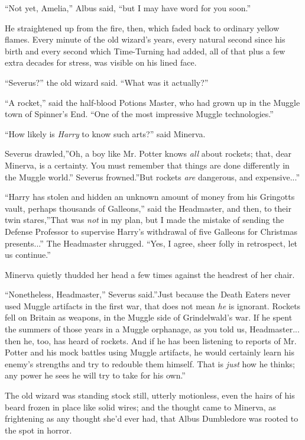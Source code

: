 ``Not yet, Amelia,'' Albus said, ``but I may have word for you soon.''

He straightened up from the fire, then, which faded back to ordinary
yellow flames. Every minute of the old wizard's years, every natural
second since his birth and every second which Time-Turning had added,
all of that plus a few extra decades for stress, was visible on his
lined face.

``Severus?'' the old wizard said. ``What was it actually?''

``A rocket,'' said the half-blood Potions Master, who had grown up in
the Muggle town of Spinner's End. ``One of the most impressive Muggle
technologies.''

``How likely is \emph{Harry} to know such arts?'' said Minerva.

Severus drawled,''Oh, a boy like Mr. Potter knows \emph{all} about
rockets; that, dear Minerva, is a certainty. You must remember that
things are done differently in the Muggle world.'' Severus frowned.''But
rockets \emph{are} dangerous, and expensive...''

``Harry has stolen and hidden an unknown amount of money from his
Gringotts vault, perhaps thousands of Galleons,'' said the Headmaster,
and then, to their twin stares,''That was \emph{not} in my plan, but I
made the mistake of sending the Defense Professor to supervise Harry's
withdrawal of five Galleons for Christmas presents...'' The
Headmaster shrugged. ``Yes, I agree, sheer folly in retrospect, let us
continue.''

Minerva quietly thudded her head a few times against the headrest of her
chair.

``Nonetheless, Headmaster,'' Severus said.''Just because the Death
Eaters never used Muggle artifacts in the first war, that does not mean
\emph{he} is ignorant. Rockets fell on Britain as weapons, in the Muggle
side of Grindelwald's war. If he spent the summers of those years in a
Muggle orphanage, as you told us, Headmaster... then he, too, has
heard of rockets. And if he has been listening to reports of Mr. Potter
and his mock battles using Muggle artifacts, he would certainly learn
his enemy's strengths and try to redouble them himself. That is
\emph{just} how he thinks; any power he sees he will try to take for his
own.''

The old wizard was standing stock still, utterly motionless, even the
hairs of his beard frozen in place like solid wires; and the thought
came to Minerva, as frightening as any thought she'd ever had, that
Albus Dumbledore was rooted to the spot in horror.

